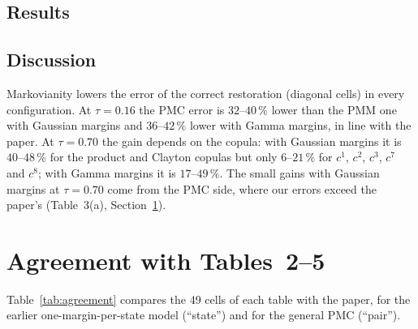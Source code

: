 \documentclass[11pt,a4paper]{article}
\begin{document}
\subsection{Results}






\subsection{Discussion}

Markovianity lowers the error of the correct restoration (diagonal cells)
in every configuration. At $\tau=0.16$ the PMC error is $32$--$40\,\%$ lower
than the PMM one with Gaussian margins and $36$--$42\,\%$ lower with Gamma
margins, in line with the paper. At $\tau=0.70$ the gain depends on the
copula: with Gaussian margins it is $40$--$48\,\%$ for the product and
Clayton copulas but only $6$--$21\,\%$ for $c^1$, $c^2$, $c^3$, $c^7$ and
$c^8$; with Gamma margins it is $17$--$49\,\%$. The small gains with Gaussian margins at
$\tau=0.70$ come from the PMC side, where our errors exceed the paper's
(Table~3(a), Section~\ref{sec:agreement}).

\section{Agreement with Tables~2--5}\label{sec:agreement}

Table~\ref{tab:agreement} compares the 49 cells of each table with the paper,
for the earlier one-margin-per-state model (``state'') and for the general PMC
(``pair'').

\begin{table}[htbp]
  \centering\small
  \caption{Difference with CSDA Tables~2--5 (our error minus the paper's, in
           points) and cell-by-cell correlation. ``state'': $f_{ij}=f_{i1}$,
           $s$ read as a standard deviation (earlier reproduction, 300
           replications); ``pair'': the four margins of Table~1, $s$ read as a
           variance (30 replications).}
  \label{tab:agreement}
  
\end{table}
\end{document}
